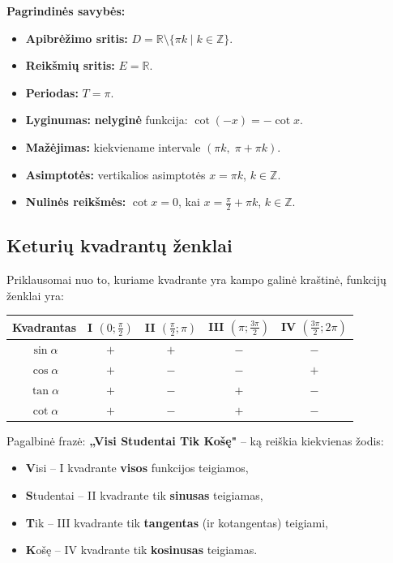 \textbf{Pagrindinės savybės:}
\begin{itemize}
    \item \textbf{Apibrėžimo sritis:} \(D = \mathbb{R} \setminus \{\pi k \mid k \in \mathbb{Z}\}\).
    \item \textbf{Reikšmių sritis:} \(E = \mathbb{R}\).
    \item \textbf{Periodas:} \(T = \pi\).
    \item \textbf{Lyginumas:} \textbf{nelyginė} funkcija: \(\cot(-x) = -\cot x\).
    \item \textbf{Mažėjimas:} kiekviename intervale \((\pi k,\; \pi + \pi k)\).
    \item \textbf{Asimptotės:} vertikalios asimptotės \(x = \pi k\), \(k \in \mathbb{Z}\).
    \item \textbf{Nulinės reikšmės:} \(\cot x = 0\), kai \(x = \frac{\pi}{2} + \pi k\), \(k \in \mathbb{Z}\).
\end{itemize}

\subsection{Keturių kvadrantų ženklai}

Priklausomai nuo to, kuriame kvadrante yra kampo galinė kraštinė, funkcijų ženklai yra:

\begin{center}
\begin{tabular}{c|c|c|c|c}
\textbf{Kvadrantas} & \textbf{I} \((0;\frac{\pi}{2})\) & \textbf{II} \((\frac{\pi}{2};\pi)\) & \textbf{III} \((\pi;\frac{3\pi}{2})\) & \textbf{IV} \((\frac{3\pi}{2};2\pi)\) \\
\hline
\(\sin\alpha\) & \(+\) & \(+\) & \(-\) & \(-\) \\
\(\cos\alpha\) & \(+\) & \(-\) & \(-\) & \(+\) \\
\(\tan\alpha\) & \(+\) & \(-\) & \(+\) & \(-\) \\
\(\cot\alpha\) & \(+\) & \(-\) & \(+\) & \(-\) \\
\end{tabular}
\end{center}

\begin{tcolorbox}[title=Mnemonika]
Pagalbinė frazė: \textbf{„Visi Studentai Tik Košę"} – ką reiškia kiekvienas žodis:
\begin{itemize}
    \item \textbf{V}isi – I kvadrante \textbf{visos} funkcijos teigiamos,
    \item \textbf{S}tudentai – II kvadrante tik \textbf{sinusas} teigiamas,
    \item \textbf{T}ik – III kvadrante tik \textbf{tangentas} (ir kotangentas) teigiami,
    \item \textbf{K}ošę – IV kvadrante tik \textbf{kosinusas} teigiamas.
\end{itemize}
\end{tcolorbox}


